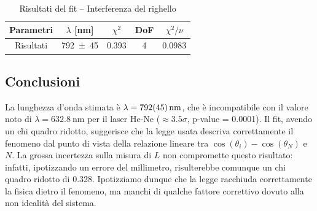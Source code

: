 \documentclass[a4paper]{article}
\begin{document}
\begin{table}[htbp]
\caption{Risultati del fit -- Interferenza del righello}
\label{tab:interferenza-righello-risultati}
\centering
\begin{tabular}{ccccc}
\toprule
Parametri & $\lambda$ [\si{\nano\meter}] & $\chi^2$ & DoF & $\chi^2/\nu$ \\
\midrule
Risultati & \num{792 \pm 45} & \num{0.393} & 4 & \num{0.0983} \\
\bottomrule
\end{tabular}
\end{table}

\subsection{Conclusioni}
La lunghezza d'onda stimata è $\lambda = \SI{792 \pm 45}{\nano\meter}$, che è incompatibile con il valore noto di $\lambda = \SI{632.8}{\nano\meter}$ per il laser He-Ne ($\approx \num{3.5}\sigma$, p-value = \num{0.0001}). Il fit, avendo un chi quadro ridotto, suggerisce che la legge usata descriva correttamente il fenomeno dal punto di vista della relazione lineare tra $\cos(\theta_i) - \cos(\theta_N)$ e $N$. La grossa incertezza sulla misura di $L$ non compromette questo risultato: infatti, ipotizzando un errore del millimetro, risulterebbe comunque un chi quadro ridotto di \num{0.328}. Ipotizziamo dunque che la legge racchiuda correttamente la fisica dietro il fenomeno, ma manchi di qualche fattore correttivo dovuto alla non idealità del sistema.
\end{document}
